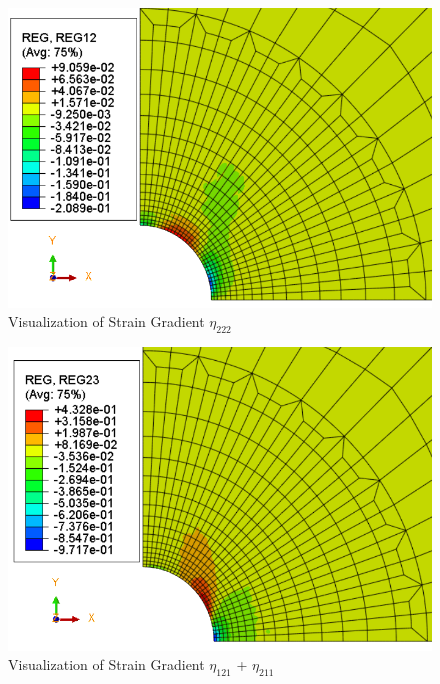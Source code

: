 \documentclass[12pt]{article}
\begin{document}
\begin{figure}[H]
	\begin{center}
		\includegraphics[scale=0.9]{Reg12_crop.png} 
	\end{center}  
   \caption{Visualization of Strain Gradient $\eta_{222} $}
\end{figure}
\begin{figure}[H]
	\begin{center}
		\includegraphics[scale=0.9]{Reg23_crop.png} 
	\end{center}  
   \caption{Visualization of Strain Gradient $\eta_{121}$ + $\eta_{211}$}
\end{figure}
\end{document}
